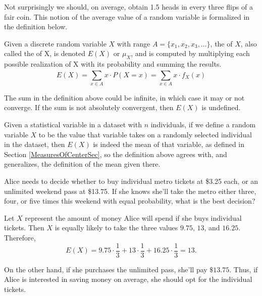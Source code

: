 Not surprisingly we should, on average, obtain 1.5 heads in every three flips of a fair coin. This notion of the average value of a random variable is formalized in the definition below.

\begin{definition}\label{expectedvaluedef}
Given a discrete random variable $X$ with range $A = \{x_1, x_2, x_3, \dots\}$, the  of $X$, also called the  of X, is denoted $E(X)$ or $\mu_X$, and is computed by multiplying each possible realization of X with its probability and summing the results.
$$E(X) = \sum_{x \in A}^{\ } x \cdot P(X = x) = \sum_{x \in A} x \cdot f_X(x)$$
\end{definition}

\begin{warning}
The sum in the definition above could be infinite, in which case it may or not converge. If the sum is not absolutely convergent, then $E(X)$ is undefined.
\end{warning}

\begin{remark}
Given a statistical variable in a dataset with $n$ individuals, if we define a random variable $X$ to be the value that variable takes on a randomly selected individual in the dataset, then $E(X)$ is indeed the mean of that variable, as defined in Section \ref{MeasuresOfCenterSec}, so the definition above agrees with, and generalizes, the definition of the mean given there.
\end{remark}

\begin{example}
Alice needs to decide whether to buy individual metro tickets at \$3.25 each, or an unlimited weekend pass at \$13.75. If she knows she'll take the metro either three, four, or five times this weekend with equal probability, what is the best decision?

Let $X$ represent the amount of money Alice will spend if she buys individual tickets. Then $X$ is equally likely to take the three values $9.75$, $13$, and $16.25$. Therefore,
$$E(X) = 9.75 \cdot \frac{1}{3} + 13 \cdot \frac{1}{3} + 16.25 \cdot \frac{1}{3} = 13.$$

On the other hand, if she purchases the unlimited pass, she'll pay $\$13.75$. Thus, if Alice is interested in saving money on average, she should opt for the individual tickets.
\end{example}

